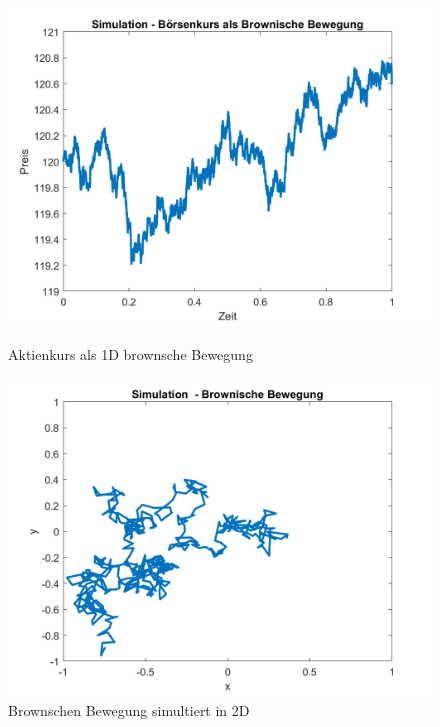 \begin{figure}
	\centering
	\begin{minipage}{0.45\textwidth}
		\centering
		\includegraphics[width=\linewidth]{papers/brown/images/Aktienkurs-als-Brownische-Bewegung_3.png}
		\caption{Aktienkurs als 1D brownsche Bewegung}
		\label{brown:1Dbrownian}
	\end{minipage}
	\hspace{0.05\linewidth}
	\begin{minipage}{0.45\textwidth}
		\centering
		\includegraphics[width=\linewidth]{papers/brown/images/Brownische-Bewegung-Simuliert_3.png}
		\caption{Brownschen Bewegung simultiert in 2D}
		\label{brown:2Dbrownian}
	\end{minipage}
\end{figure}

